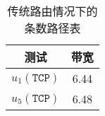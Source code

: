 
\begin{table}[h]
  \centering
  \begin{tabular}{cc}
    \toprule
    测试 & 带宽 \\
    \midrule
    $ u_1(\texttt{TCP}) $ & 6.44 \\
    $ u_5(\texttt{TCP}) $ & 6.48\\
    \bottomrule
  \end{tabular}
  \caption{传统路由情况下的条数路径表}
\end{table}